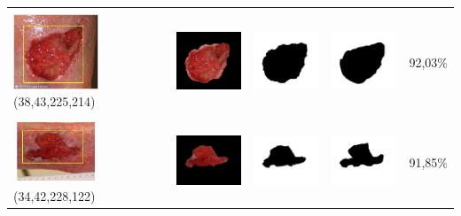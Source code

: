 \begin{table}[H]
\begin{tabular}{|m{1.0in}|m{1.0in}|m{1.0in}|m{1.0in}|m{0.6in}|}
				
		&  &  & \\
		\includegraphics[width=1.0in]{gambar/hasil_segmentasi/luka_merah/image_20_rect.jpg} {\centering\fontsize{10}{10}\selectfont(38,43,225,214)}&
		\includegraphics[width=1.0in]{gambar/hasil_segmentasi/luka_merah/result_20.jpg}&
		\includegraphics[width=1.0in]{gambar/hasil_segmentasi/luka_merah/mask_r_20.jpg}&
		\includegraphics[width=1.0in]{gambar/hasil_segmentasi/luka_merah/20_r.jpg}&
		92,03\% \\
		\hline

		&  &  & \\
		\includegraphics[width=1.0in]{gambar/hasil_segmentasi/luka_merah/image_23_rect.jpg} {\centering\fontsize{10}{10}\selectfont(34,42,228,122)}&
		\includegraphics[width=1.0in]{gambar/hasil_segmentasi/luka_merah/result_23.jpg}&
		\includegraphics[width=1.0in]{gambar/hasil_segmentasi/luka_merah/mask_r_23.jpg}&
		\includegraphics[width=1.0in]{gambar/hasil_segmentasi/luka_merah/23_r.jpg}&
		91,85\% \\
		\hline


\end{tabular}
\end{table}

